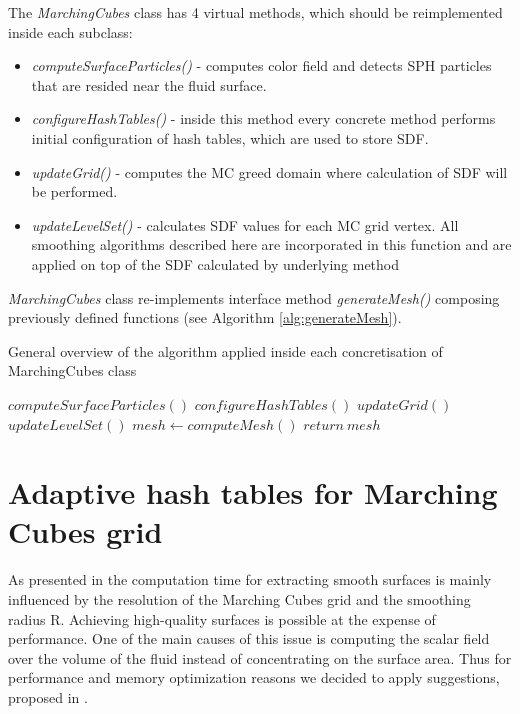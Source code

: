 The \emph{MarchingCubes} class has 4 virtual methods, which should be reimplemented inside each subclass:
\begin{itemize}
	\item \emph{computeSurfaceParticles()} - computes color field and detects SPH particles that are resided near the fluid surface.
	\item \emph{configureHashTables()} - inside this method every concrete method performs initial configuration of hash tables, which are used to store SDF.
	\item \emph{updateGrid()} - computes the MC greed domain where calculation of SDF will be performed.
	\item \emph{updateLevelSet()} - calculates SDF values for each MC grid vertex. All smoothing algorithms described here are incorporated in this function and are applied on top of the SDF calculated by underlying method 
\end{itemize}
\emph{MarchingCubes} class re-implements interface method \emph{generateMesh()} composing previously defined functions (see Algorithm \ref{alg:generateMesh}).

\begin{algorithm}
	\scriptsize
	\caption{General overview of the algorithm applied inside each concretisation of MarchingCubes class}
	\label{alg:generateMesh}
	\begin{algorithmic}
		\State $computeSurfaceParticles()$
		\State $configureHashTables()$
		\State $updateGrid()$
		\State $updateLevelSet()$
		\State $mesh \gets computeMesh()$ 
		\State $return\ mesh$
	\end{algorithmic}
\end{algorithm}

\section{Adaptive hash tables for Marching Cubes grid}

As presented in \cite{Akinchi} the computation time for extracting smooth surfaces is mainly influenced by the resolution of the Marching Cubes grid and the smoothing radius R. Achieving high-quality surfaces is possible at the expense of performance. One of the main causes of this issue is computing the scalar field over the volume of the fluid instead of concentrating on the surface area. Thus for performance and memory optimization reasons we decided to apply suggestions, proposed in \cite{Akinchi}.

